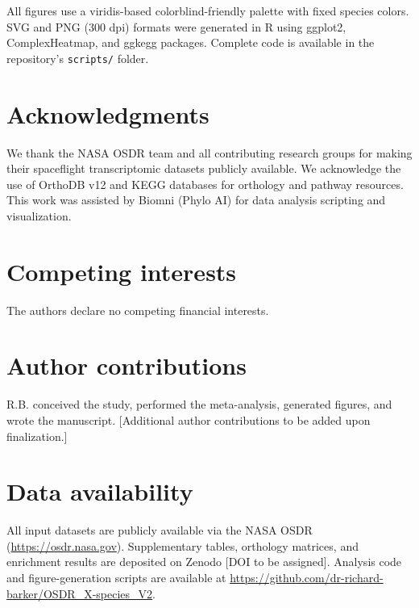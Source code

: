 \documentclass[11pt,a4paper]{article}
\begin{document}
All figures use a viridis-based colorblind-friendly palette with fixed species colors. 
SVG and PNG (300 dpi) formats were generated in R using ggplot2, ComplexHeatmap, and 
ggkegg packages. Complete code is available in the repository's \texttt{scripts/} folder.

\section*{Acknowledgments}

We thank the NASA OSDR team and all contributing research groups for making their 
spaceflight transcriptomic datasets publicly available. We acknowledge the use of 
OrthoDB v12 and KEGG databases for orthology and pathway resources. This work was 
assisted by Biomni (Phylo AI) for data analysis scripting and visualization.

\section*{Competing interests}

The authors declare no competing financial interests.

\section*{Author contributions}

R.B. conceived the study, performed the meta-analysis, generated figures, and wrote 
the manuscript. [Additional author contributions to be added upon finalization.]

\section*{Data availability}

All input datasets are publicly available via the NASA OSDR 
(\url{https://osdr.nasa.gov}). Supplementary tables, orthology matrices, and 
enrichment results are deposited on Zenodo [DOI to be assigned]. Analysis code 
and figure-generation scripts are available at 
\url{https://github.com/dr-richard-barker/OSDR_X-species_V2}.

\newpage
\printbibliography

\newpage
\appendix
\end{document}
